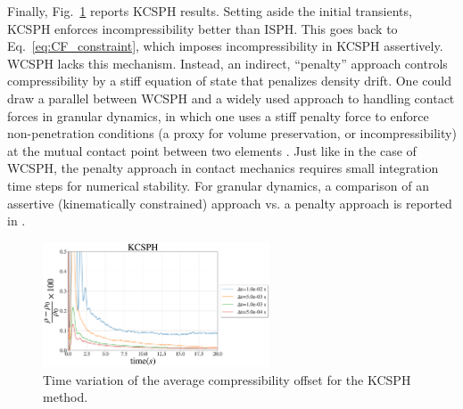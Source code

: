 Finally, Fig.~\ref{fig:Compressibility_kcsph} reports KCSPH results. Setting aside the initial transients, KCSPH enforces incompressibility better than ISPH. This goes back to Eq.~\ref{eq:CF_constraint}, which imposes incompressibility in KCSPH assertively. WCSPH lacks this mechanism. Instead, an indirect, ``penalty'' approach controls compressibility by a stiff equation of state that penalizes density drift. One could draw a parallel between WCSPH and a widely used approach to handling contact forces in granular dynamics, in which one uses a stiff penalty force to enforce non-penetration conditions (a proxy for volume preservation, or incompressibility) at the mutual contact point between two elements \cite{cundall79}. Just like in the case of WCSPH, the penalty approach in contact mechanics requires small integration time steps for numerical stability. For granular dynamics, a comparison of an assertive (kinematically constrained) approach vs. a penalty approach is reported in \cite{armanDEMP-DEMC2017}. %
\begin{figure}[H]
	\begin{center}
		\includegraphics[width=0.6\textwidth]{images/SPH_Comparison/Figure_compressibility_KCSPH.png}
	\end{center}
	\caption{Time variation of the average compressibility offset for the KCSPH method.}
	\label{fig:Compressibility_kcsph}
\end{figure}

